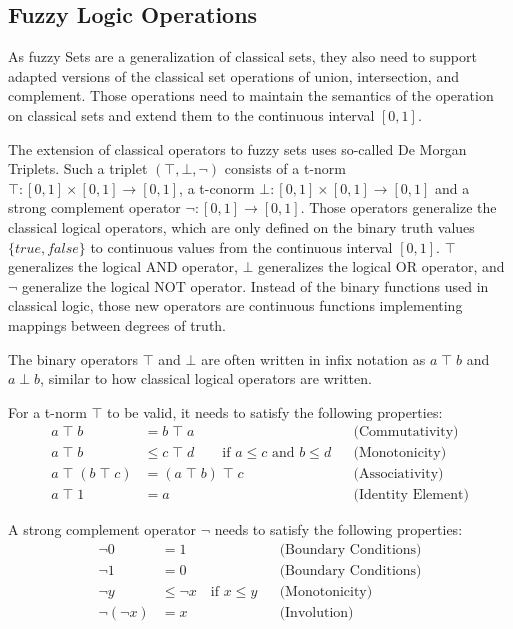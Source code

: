 \subsection{Fuzzy Logic Operations}

As fuzzy Sets are a generalization of classical sets, they also need to support adapted versions of the classical set operations of union, intersection, and complement. Those operations need to maintain the semantics of the operation on classical sets and extend them to the continuous interval $[0, 1]$.

The extension of classical operators to fuzzy sets uses so-called De Morgan Triplets. Such a triplet $(\top, \bot, \neg)$ consists of a t-norm $\top : [0, 1] \times [0, 1] \rightarrow [0, 1]$, a t-conorm $\bot : [0, 1] \times [0, 1] \rightarrow [0, 1]$ and a strong complement operator $\neg : [0, 1] \rightarrow [0, 1]$. Those operators generalize the classical logical operators, which are only defined on the binary truth values $\{true, false\}$ to continuous values from the continuous interval $[0, 1]$. $\top$ generalizes the logical AND operator, $\bot$ generalizes the logical OR operator, and $\neg$ generalize the logical NOT operator. Instead of the binary functions used in classical logic, those new operators are continuous functions implementing mappings between degrees of truth.

The binary operators $\top$ and $\bot$ are often written in infix notation as $a \; \top \; b$ and $a \; \bot \; b$, similar to how classical logical operators are written.
\smallskip

For a t-norm $\top$ to be valid, it needs to satisfy the following properties:
\begin{align*}
      a \;  \top \;  b              & = b \; \top \; a                                                     &  & \text{(Commutativity)}    \\
      a \; \top \;  b               & \leq c \; \top\;  d \qquad \text{if } a \leq c \text{ and } b \leq d &  & \text{(Monotonicity)}     \\
      a \; \top \; (b \; \top\;  c) & = (a \; \top\;  b) \; \top\;  c                                      &  & \text{(Associativity)}    \\
      a \; \top\;  1                & = a                                                                  &  & \text{(Identity Element)}
\end{align*}

A strong complement operator $\neg$ needs to satisfy the following properties:
\begin{align*}
      \neg 0        & = 1                                   &  & \text{(Boundary Conditions)} \\
      \neg 1        & = 0                                   &  & \text{(Boundary Conditions)} \\
      \neg y        & \leq \neg x \quad \text{if } x \leq y &  & \text{(Monotonicity)}        \\
      \neg (\neg x) & = x                                   &  & \text{(Involution)}
\end{align*}


